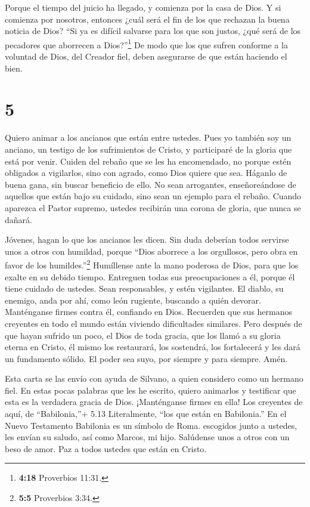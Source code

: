  Porque el tiempo del juicio ha llegado, y comienza por la
casa de Dios. Y si comienza por nosotros, entonces ¿cuál será el fin de
los que rechazan la buena noticia de Dios?  ``Si ya es
difícil salvarse para los que son justos, ¿qué será de los pecadores que
aborrecen a Dios?''\footnote{\textbf{4:18} Proverbios 11:31.}
 De modo que los que sufren conforme a la voluntad de Dios,
del Creador fiel, deben asegurarse de que están haciendo el bien.

\hypertarget{section-4}{%
\section{5}\label{section-4}}

 Quiero animar a los ancianos que están entre ustedes. Pues
yo también soy un anciano, un testigo de los sufrimientos de Cristo, y
participaré de la gloria que está por venir.  Cuiden del
rebaño que se les ha encomendado, no porque estén obligados a
vigilarlos, sino con agrado, como Dios quiere que sea. Háganlo de buena
gana, sin buscar beneficio de ello.  No sean arrogantes,
enseñoreándose de aquellos que están bajo su cuidado, sino sean un
ejemplo para el rebaño.  Cuando aparezca el Pastor supremo,
ustedes recibirán una corona de gloria, que nunca se dañará.

 Jóvenes, hagan lo que los ancianos les dicen. Sin duda
deberían todos servirse unos a otros con humildad, porque ``Dios
aborrece a los orgullosos, pero obra en favor de los
humildes.''\footnote{\textbf{5:5} Proverbios 3:34.} 
Humíllense ante la mano poderosa de Dios, para que los exalte en su
debido tiempo.  Entreguen todas sus preocupaciones a él,
porque él tiene cuidado de ustedes.  Sean responsables, y
estén vigilantes. El diablo, su enemigo, anda por ahí, como león
rugiente, buscando a quién devorar.  Manténganse firmes
contra él, confiando en Dios. Recuerden que sus hermanos creyentes en
todo el mundo están viviendo dificultades similares.  Pero
después de que hayan sufrido un poco, el Dios de toda gracia, que los
llamó a su gloria eterna en Cristo, él mismo los restaurará, los
sostendrá, los fortalecerá y les dará un fundamento sólido.
 El poder sea suyo, por siempre y para siempre. Amén.

 Esta carta se las envío con ayuda de Silvano, a quien
considero como un hermano fiel. En estas pocas palabras que les he
escrito, quiero animarlos y testificar que esta es la verdadera gracia
de Dios. ¡Manténganse firmes en ella!  Los creyentes de
aquí, de ``Babilonia,''+ 5.13 Literalmente, ``los que están en
Babilonia.'' En el Nuevo Testamento Babilonia es un símbolo de Roma.
escogidos junto a ustedes, les envían su saludo, así como Marcos, mi
hijo.  Salúdense unos a otros con un beso de amor. Paz a
todos ustedes que están en Cristo.
